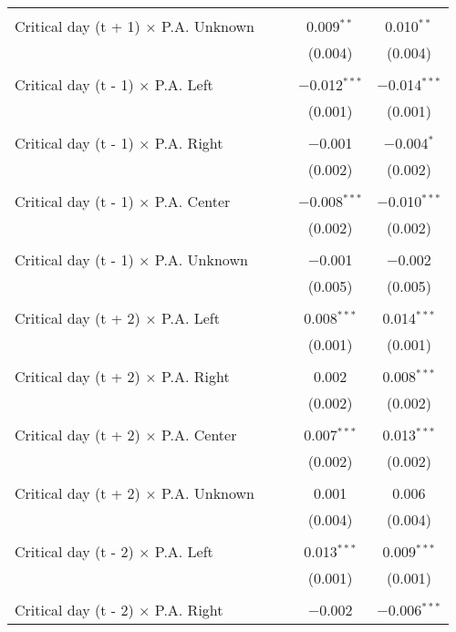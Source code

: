 \documentclass[
]{article}
\begin{document}
\begin{table}[!htbp]
{\begin{tabular}{@{\extracolsep{5pt}}lcccc}
  & & & & \\ 
 Critical day (t + 1) $\times$ P.A. Unknown &  &  & 0.009$^{**}$ & 0.010$^{**}$ \\ 
  &  &  & (0.004) & (0.004) \\ 
  & & & & \\ 
 Critical day (t - 1) $\times$ P.A. Left &  &  & $-$0.012$^{***}$ & $-$0.014$^{***}$ \\ 
  &  &  & (0.001) & (0.001) \\ 
  & & & & \\ 
 Critical day (t - 1) $\times$ P.A. Right &  &  & $-$0.001 & $-$0.004$^{*}$ \\ 
  &  &  & (0.002) & (0.002) \\ 
  & & & & \\ 
 Critical day (t - 1) $\times$ P.A. Center &  &  & $-$0.008$^{***}$ & $-$0.010$^{***}$ \\ 
  &  &  & (0.002) & (0.002) \\ 
  & & & & \\ 
 Critical day (t - 1) $\times$ P.A. Unknown &  &  & $-$0.001 & $-$0.002 \\ 
  &  &  & (0.005) & (0.005) \\ 
  & & & & \\ 
 Critical day (t + 2) $\times$ P.A. Left &  &  & 0.008$^{***}$ & 0.014$^{***}$ \\ 
  &  &  & (0.001) & (0.001) \\ 
  & & & & \\ 
 Critical day (t + 2) $\times$ P.A. Right &  &  & 0.002 & 0.008$^{***}$ \\ 
  &  &  & (0.002) & (0.002) \\ 
  & & & & \\ 
 Critical day (t + 2) $\times$ P.A. Center &  &  & 0.007$^{***}$ & 0.013$^{***}$ \\ 
  &  &  & (0.002) & (0.002) \\ 
  & & & & \\ 
 Critical day (t + 2) $\times$ P.A. Unknown &  &  & 0.001 & 0.006 \\ 
  &  &  & (0.004) & (0.004) \\ 
  & & & & \\ 
 Critical day (t - 2) $\times$ P.A. Left &  &  & 0.013$^{***}$ & 0.009$^{***}$ \\ 
  &  &  & (0.001) & (0.001) \\ 
  & & & & \\ 
 Critical day (t - 2) $\times$ P.A. Right &  &  & $-$0.002 & $-$0.006$^{***}$ \\ 

\end{tabular}}
\end{table}
\end{document}
